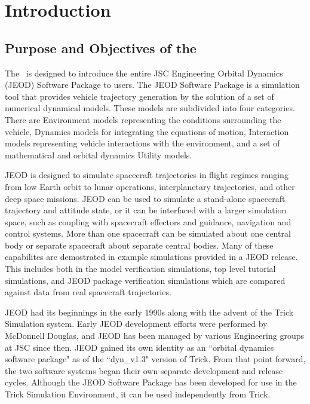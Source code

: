 %
%
%
%
%
%
\chapter{Introduction}\label{ch:intro}%

\section{Purpose and Objectives of the \MODELTITLE}

The \TLD\ is designed to introduce the entire JSC Engineering Orbital Dynamics (JEOD) Software Package to users. The JEOD Software Package is a simulation tool that provides vehicle trajectory generation by the solution of a set of numerical dynamical models. These models are subdivided into four categories. There are Environment models representing the conditions surrounding the vehicle, Dynamics models for integrating the equations of motion, Interaction models representing vehicle interactions with the environment, and a set of mathematical and orbital dynamics Utility models.

JEOD is designed to simulate spacecraft trajectories in flight regimes ranging from low Earth orbit to lunar operations, interplanetary trajectories, and other deep space missions. JEOD can be used to simulate a stand-alone spacecraft trajectory and attitude state, or it can be interfaced with a larger simulation space, such as coupling with spacecraft effectors and guidance, navigation and control systems. More than one spacecraft can be simulated about one central body or separate spacecraft about separate central bodies. Many of these capabilites are demostrated in example simulations provided in a JEOD release.  This includes both in the model verification simulations, top level tutorial simulations, and JEOD package verification simulations which are compared against data from real spacecraft trajectories.

JEOD had its beginnings in the early 1990s along with the advent of the Trick Simulation system.  Early JEOD development efforts were performed by McDonnell Douglas, and JEOD has been managed by various Engineering groups at JSC since then.  JEOD gained its own identity as an ``orbital dynamics software package" as of the ``dyn\_v1.3" version of Trick.  From that point forward, the two software systems began their own separate development and release cycles. Although the JEOD Software Package has been developed for use in the Trick Simulation Environment, it can be used independently from Trick.

